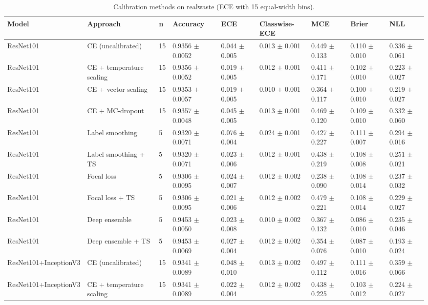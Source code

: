 \begin{table}[ht]
\centering
\small
\caption{Calibration methods on realwaste (ECE with 15 equal-width bins).}
\label{tab:tab4_calibration_methods}
\begin{tabular}{lllllllll}
\hline
Model & Approach & n & Accuracy & ECE & Classwise-ECE & MCE & Brier & NLL \\
\hline
ResNet101 & CE (uncalibrated) & 15 & 0.9356 $\pm$ 0.0052 & 0.044 $\pm$ 0.005 & 0.013 $\pm$ 0.001 & 0.449 $\pm$ 0.133 & 0.110 $\pm$ 0.010 & 0.336 $\pm$ 0.061 \\
ResNet101 & CE + temperature scaling & 15 & 0.9356 $\pm$ 0.0052 & 0.019 $\pm$ 0.005 & 0.012 $\pm$ 0.001 & 0.411 $\pm$ 0.171 & 0.102 $\pm$ 0.010 & 0.223 $\pm$ 0.027 \\
ResNet101 & CE + vector scaling & 15 & 0.9353 $\pm$ 0.0057 & 0.019 $\pm$ 0.005 & 0.010 $\pm$ 0.001 & 0.364 $\pm$ 0.117 & 0.100 $\pm$ 0.010 & 0.219 $\pm$ 0.027 \\
ResNet101 & CE + MC-dropout & 15 & 0.9357 $\pm$ 0.0048 & 0.045 $\pm$ 0.005 & 0.013 $\pm$ 0.001 & 0.469 $\pm$ 0.120 & 0.109 $\pm$ 0.010 & 0.332 $\pm$ 0.060 \\
ResNet101 & Label smoothing & 5 & 0.9320 $\pm$ 0.0071 & 0.076 $\pm$ 0.004 & 0.024 $\pm$ 0.001 & 0.427 $\pm$ 0.227 & 0.111 $\pm$ 0.007 & 0.294 $\pm$ 0.016 \\
ResNet101 & Label smoothing + TS & 5 & 0.9320 $\pm$ 0.0071 & 0.023 $\pm$ 0.006 & 0.012 $\pm$ 0.001 & 0.438 $\pm$ 0.219 & 0.108 $\pm$ 0.008 & 0.251 $\pm$ 0.021 \\
ResNet101 & Focal loss & 5 & 0.9306 $\pm$ 0.0095 & 0.024 $\pm$ 0.007 & 0.012 $\pm$ 0.002 & 0.238 $\pm$ 0.090 & 0.108 $\pm$ 0.014 & 0.237 $\pm$ 0.032 \\
ResNet101 & Focal loss + TS & 5 & 0.9306 $\pm$ 0.0095 & 0.021 $\pm$ 0.006 & 0.012 $\pm$ 0.002 & 0.479 $\pm$ 0.221 & 0.108 $\pm$ 0.014 & 0.229 $\pm$ 0.027 \\
ResNet101 & Deep ensemble & 5 & 0.9453 $\pm$ 0.0050 & 0.023 $\pm$ 0.008 & 0.010 $\pm$ 0.002 & 0.367 $\pm$ 0.132 & 0.086 $\pm$ 0.010 & 0.235 $\pm$ 0.046 \\
ResNet101 & Deep ensemble + TS & 5 & 0.9453 $\pm$ 0.0069 & 0.027 $\pm$ 0.004 & 0.012 $\pm$ 0.002 & 0.354 $\pm$ 0.076 & 0.087 $\pm$ 0.010 & 0.193 $\pm$ 0.024 \\
ResNet101+InceptionV3 & CE (uncalibrated) & 15 & 0.9341 $\pm$ 0.0089 & 0.048 $\pm$ 0.010 & 0.013 $\pm$ 0.002 & 0.497 $\pm$ 0.112 & 0.111 $\pm$ 0.016 & 0.359 $\pm$ 0.066 \\
ResNet101+InceptionV3 & CE + temperature scaling & 15 & 0.9341 $\pm$ 0.0089 & 0.022 $\pm$ 0.004 & 0.012 $\pm$ 0.002 & 0.438 $\pm$ 0.225 & 0.103 $\pm$ 0.012 & 0.224 $\pm$ 0.027 \\

\end{tabular}
\end{table}
